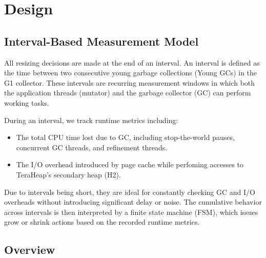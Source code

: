 \section{Design}

\subsection{Interval-Based Measurement Model}

All resizing decisions are made at the end of an interval. An interval is defined as the time between 
two consecutive young garbage collections (Young GCs) in the G1 collector. These intervals are recurring 
measurement windows in which both the application threads (mutator) and the garbage collector (GC) can perform working tasks.

During an interval, we track runtime metrics including:
\begin{itemize}
  \item The total CPU time lost due to GC, including stop-the-world pauses, concurrent GC threads, and refinement threads.
  \item The I/O overhead introduced by page cache while perfoming accesses to TeraHeap's secondary heap (H2).
\end{itemize}

Due to intervals being short, they are ideal for constantly checking GC and I/O overheads 
without introducing significant delay or noise. The cumulative behavior across intervals is
then interpreted by a finite state machine (FSM), which issues grow or shrink 
actions based on the recorded runtime metrics.

\subsection{Overview}

%

